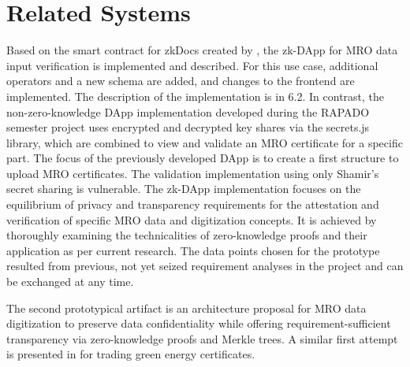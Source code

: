 \section{Related Systems}
Based on the smart contract for zkDocs created by \citep{zkdocs}, the zk-DApp for MRO data input verification is implemented and described. For this use case, additional operators and a new schema are added, and changes to the frontend are implemented. The description of the implementation is in 6.2. In contrast, the non-zero-knowledge DApp implementation developed during the RAPADO semester project uses encrypted and decrypted key shares via the secrets.js library, which are combined to view and validate an MRO certificate for a specific part. The focus of the previously developed DApp is to create a first structure to upload MRO certificates. The validation implementation using only Shamir's secret sharing is vulnerable. The zk-DApp implementation focuses on the equilibrium of privacy and transparency requirements for the attestation and verification of specific MRO data and digitization concepts. It is achieved by thoroughly examining the technicalities of zero-knowledge proofs and their application as per current research. The data points chosen for the prototype resulted from previous, not yet seized requirement analyses in the project and can be exchanged at any time. 

The second prototypical artifact is an architecture proposal for MRO data digitization to preserve data confidentiality while offering requirement-sufficient transparency via zero-knowledge proofs and Merkle trees. A similar first attempt is presented in \citet{sedlemeirgrenenergy} for trading green energy certificates. 
